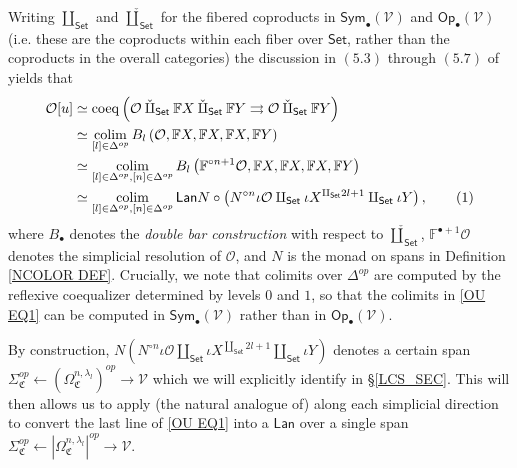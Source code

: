 \documentclass[a4paper,10pt
,draft
]{article}%
\numberwithin{equation}{section}
\numberwithin{figure}{section}
\theoremstyle{definition} %
\DeclareMathOperator{\colim}{colim}%
\renewcommand{\O}{\ensuremath{\mathcal O}}
\newcommand{\1}{\ensuremath{\mathbbm 1}}%
\begin{document}
Writing $\amalg_{\mathsf{Set}}$ and $\mathbin{\check\amalg}_{\mathsf{Set}}$
for the fibered coproducts in 
$\mathsf{Sym}_{\bullet}(\mathcal{V})$ and
$\mathsf{Op}_{\bullet}(\mathcal{V})$
(i.e. these are the coproducts within each fiber over $\mathsf{Set}$, rather than the coproducts in the overall categories)
the discussion in $(5.3)$ through $(5.7)$ of \cite{BP_geo}
yields that
\begin{align*}
  \O[u]
  &
    \simeq \mathrm{coeq}\left(
          \O \mathbin{\check\amalg_{\mathsf{Set}}} \mathbb F X \mathbin{\check\amalg}_{\mathsf{Set}} \mathbb F Y \rightrightarrows \O \mathbin{\check\amalg}_{\mathsf{Set}} \mathbb F Y
          \right)
  \\
  &
    \simeq \colim_{[l] \in \Delta^{op}} 
    B_l \left( \O, \mathbb F X, \mathbb F X, \mathbb F X, \mathbb FY \right)
  \\
  &
    \simeq \colim_{[l] \in \Delta^{op},[n] \in \Delta^{op}} 
    B_l \left( \mathbb F^{\circ n+1} \O, \mathbb F X, \mathbb F X, \mathbb F X, \mathbb FY \right)
  \\
  &
    \simeq \colim_{[l] \in \Delta^{op},[n] \in \Delta^{op}} 
    \mathsf{Lan} N \circ \left( N^{\circ n} \iota \O \amalg_{\mathsf{Set}} \iota X^{\amalg_{\mathsf{Set}} 2l +1} \amalg_{\mathsf{Set}} \iota Y \right),
    \stepcounter{equation}\tag{\theequation}\label{OU EQ1}
\end{align*}
where $B_{\bullet}$ denotes the \textit{double bar construction}
with respect to $\mathbin{\check\amalg}_{\mathsf{Set}}$,
$\mathbb{F}^{\bullet +1} \mathcal{O}$ denotes the simplicial resolution of $\mathcal{O}$, 
and $N$ is the monad on spans in Definition \ref{NCOLOR DEF}.
Crucially, we note that colimits over $\Delta^{op}$
are computed by the reflexive coequalizer determined by levels $0$ and $1$, 
so that the colimits in \eqref{OU EQ1}
can be computed in $\mathsf{Sym}_{\bullet}(\mathcal{V})$
rather than in $\mathsf{Op}_{\bullet}(\mathcal{V})$.

By construction,
$N \left(N^{\circ n} \iota \O \amalg_{\mathsf{Set}} \iota X^{\amalg_{\mathsf{Set}} 2l +1}\amalg_{\mathsf{Set}} \iota Y \right)$
denotes a certain span
$\Sigma_{\mathfrak{C}}^{op} \leftarrow 
\left(\Omega^{n,\lambda_l}_{\mathfrak{C}}\right)^{op} \to \mathcal{V}$
which we will explicitly identify 
in \S \ref{LCS_SEC}.
This will then allows us to 
apply (the natural analogue of)
\cite[Prop. 5.37]{BP_geo}
along each simplicial direction
to convert the last line of \eqref{OU EQ1}
into a $\mathsf{Lan}$
over a single span
$\Sigma_{\mathfrak{C}}^{op} \leftarrow 
\left|\Omega^{n,\lambda_l}_{\mathfrak{C}}\right|^{op} \to \mathcal{V}$.
\end{document}

